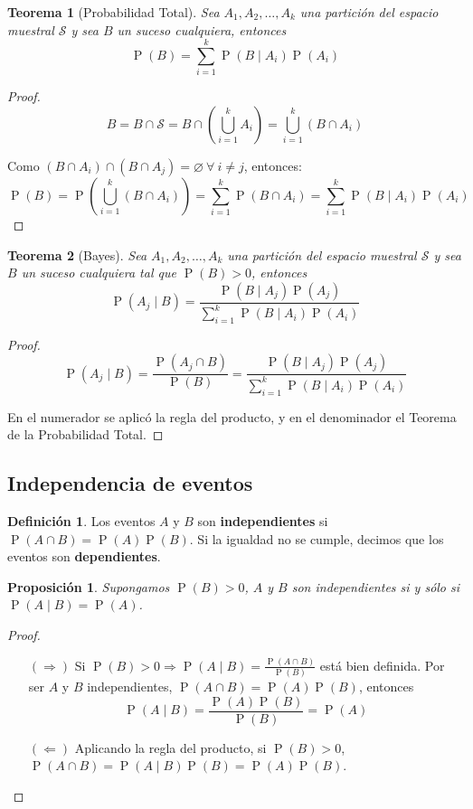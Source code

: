 \documentclass[11pt]{article}
\theoremstyle{plain}
\newtheorem*{teo}{Teorema}
\newtheorem*{pro}{Proposición}
\theoremstyle{definition}
\newtheorem*{defi}{Definición}
\theoremstyle{remark}
\newcommand{\deft}[1]{\textbf{#1}}  %
\newcommand{\proba}{\ensuremath{\operatorname{P}}}  %
\newcommand{\espm}[0]{\ensuremath{\mathcal{S}}}  %
\newcommand{\foralle}{\ensuremath{\forall \ }}  %
\begin{document}
    \begin{teo}[Probabilidad Total]
      Sea $A_1, A_2, \dots, A_k$ una partición del espacio muestral $\espm$ y sea $B$ un suceso cualquiera, entonces
      \[ \proba(B) = \sum_{i=1}^k \proba(B \mid A_i) \proba(A_i) \]
    \end{teo}

    \begin{proof}
      \[ B = B \cap \espm = B \cap \left( \bigcup_{i=1}^k A_i \right) = \bigcup_{i=1}^k (B \cap A_i) \]

      Como $(B \cap A_i) \cap (B \cap A_j) = \varnothing \ \foralle i \neq j$, entonces:
      \[ \proba(B) = \proba \left( \bigcup_{i=1}^k (B \cap A_i) \right) = \sum_{i=1}^k \proba(B \cap A_i) = \sum_{i=1}^k \proba(B \mid A_i) \proba(A_i)\]
    \end{proof}

    \begin{teo}[Bayes]
      Sea $A_1, A_2, \dots, A_k$ una partición del espacio muestral $\espm$ y sea $B$ un suceso cualquiera tal que $\proba(B) > 0$, entonces
      \[ \proba(A_j \mid B) = \frac{\proba(B \mid A_j) \proba(A_j)}{\sum_{i=1}^k \proba(B \mid A_i) \proba(A_i)} \]
    \end{teo}

    \begin{proof}
      \[ \proba(A_j \mid B) = \frac{\proba(A_j \cap B)}{\proba(B)} = \frac{\proba(B \mid A_j) \proba(A_j)}{\sum_{i=1}^k \proba(B \mid A_i) \proba(A_i)} \]

      En el numerador se aplicó la regla del producto, y en el denominador el Teorema de la Probabilidad Total.
    \end{proof}

  \subsection{Independencia de eventos}
    \begin{defi}
      Los eventos $A$ y $B$ son \deft{independientes} si $\proba(A \cap B) = \proba(A) \proba(B)$. Si la igualdad no se cumple, decimos que los eventos son \deft{dependientes}.
    \end{defi}

    \begin{pro}
      Supongamos $\proba(B) > 0$, $A$ y $B$ son independientes si y sólo si $\proba(A \mid B) = \proba(A)$.
    \end{pro}
    \begin{proof} \ 
      \begin{itemize}
        \item[$(\Rightarrow)$] Si $\proba(B) > 0 \Rightarrow \proba(A \mid B) = \frac{\proba(A \cap B)}{\proba(B)}$ está bien definida. Por ser $A$ y $B$ independientes, $\proba(A \cap B) = \proba(A) \proba(B)$, entonces
        \[ \proba(A \mid B) = \frac{\proba(A) \proba(B)}{\proba(B)} = \proba(A) \]
        \item[$(\Leftarrow)$] Aplicando la regla del producto, si $\proba(B) > 0$, $\proba(A \cap B) = \proba(A \mid B) \proba(B) = \proba(A) \proba (B)$.
      \end{itemize}
    \end{proof}
\end{document}
